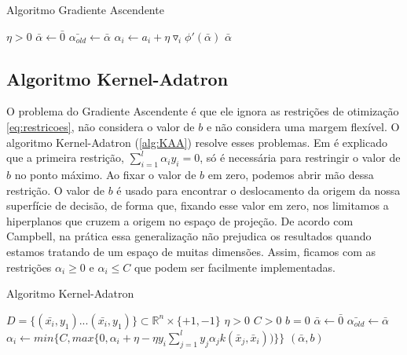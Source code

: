 \begin{algorithm}[h!]
\caption{Algoritmo Gradiente Ascendente}
\label{alg:gradiente}
\begin{algorithmic}[1]
\STATE $\eta>0$
\STATE $\bar{\alpha} \leftarrow \bar{0}$
\REPEAT
\STATE $\bar{\alpha_{old}} \leftarrow \bar{\alpha}$
\STATE $\alpha_i \leftarrow a_i + \eta \triangledown_i {\phi}'(\bar{\alpha})$
\ENDFOR
{}
\RETURN $\bar{\alpha}$
\end{algorithmic}
\end{algorithm}

\subsection{Algoritmo Kernel-Adatron} \label{sec:kaa}
O problema do Gradiente Ascendente é que ele ignora as restrições de otimização \ref{eq:restricoes}, não considera o valor de $b$ e não considera uma margem flexível. O algoritmo Kernel-Adatron (\ref{alg:KAA}) resolve esses problemas. Em \cite{art:LIVRO_KAA} é explicado que a primeira restrição, $\sum_{i=1}^{l}\alpha_i y_i = 0$, só é necessária para restringir o valor de $b$ no ponto máximo. Ao fixar o valor de $b$ em zero, podemos abrir mão dessa restrição. O valor de $b$ é usado para encontrar o deslocamento da origem da nossa superfície de decisão, de forma que, fixando esse valor em zero, nos limitamos a hiperplanos que cruzem a origem no espaço de projeção. De acordo com Campbell, na prática essa generalização não prejudica os resultados quando estamos tratando de um espaço de muitas dimensões. Assim, ficamos com as restrições $\alpha_i \ge 0$ e $\alpha_i \le C$ que podem ser facilmente implementadas.

\begin{algorithm}[h!]
\caption{Algoritmo Kernel-Adatron}
\label{alg:KAA}
\begin{algorithmic}[2]
\STATE $D = \{(\bar{x_i},y_1)...(\bar{x_i},y_1)\} \subset \mathbb{R}^{n}\times \{+1,-1\}$
\STATE $\eta>0$
\STATE $C>0$
\STATE $b=0$
\STATE $\bar{\alpha} \leftarrow \bar{0}$
\REPEAT
\STATE $\bar{\alpha_{old}} \leftarrow \bar{\alpha}$
\STATE $\alpha_i \leftarrow min\big\{C,max\big\{0,\alpha_i + \eta-\eta y_i \sum_{j=1}^l y_j \alpha_j k(\bar{x}_j,\bar{x}_i))\big\}\big\}$
\ENDFOR
{}
\RETURN $(\bar{\alpha},b)$
\end{algorithmic}
\end{algorithm}

